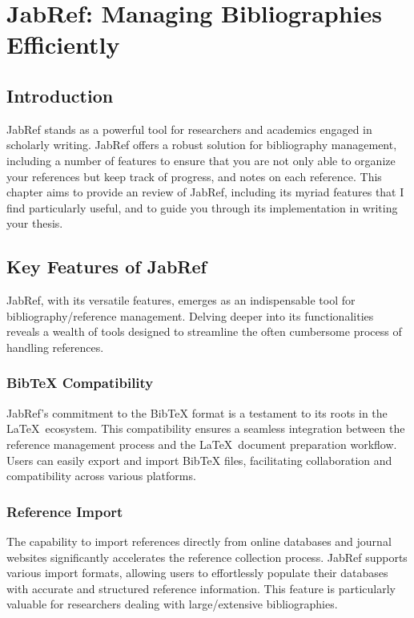 \chapter{JabRef: Managing Bibliographies Efficiently}\label{ch:JabRef}
	\section{Introduction}\label{sec:JRIntroduction}
		JabRef stands as a powerful tool for researchers and academics engaged in scholarly writing.
		JabRef offers a robust solution for bibliography management, including a number of features to ensure that you are not only able to organize your references but keep track of progress, and notes on each reference.
		This chapter aims to provide an review of JabRef, including its myriad features that I find particularly useful, and to guide you through its implementation in writing your thesis.

	\section{Key Features of JabRef}
		JabRef, with its versatile features, emerges as an indispensable tool for bibliography/reference management. 
		Delving deeper into its functionalities reveals a wealth of tools designed to streamline the often cumbersome process of handling references. 

		\subsection{BibTeX Compatibility}
			JabRef's commitment to the BibTeX format is a testament to its roots in the \LaTeX\ ecosystem. 
			This compatibility ensures a seamless integration between the reference management process and the \LaTeX\ document preparation workflow. 
			Users can easily export and import BibTeX files, facilitating collaboration and compatibility across various platforms.

		\subsection{Reference Import}
			The capability to import references directly from online databases and journal websites significantly accelerates the reference collection process. 
			JabRef supports various import formats, allowing users to effortlessly populate their databases with accurate and structured reference information. 
			This feature is particularly valuable for researchers dealing with large/extensive bibliographies.

